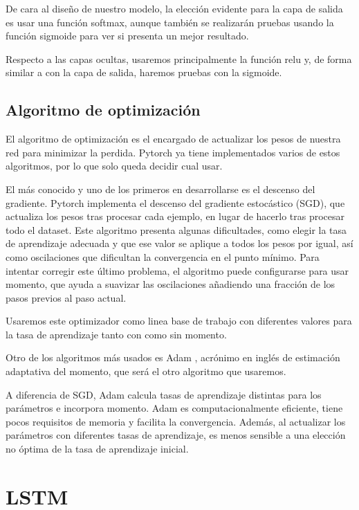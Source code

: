 De cara al diseño de nuestro modelo, la elección evidente para la capa
de salida es usar una función softmax, aunque también se realizarán
pruebas usando la función sigmoide para ver si presenta un mejor
resultado.

Respecto a las capas ocultas, usaremos principalmente la función relu y,
de forma similar a con la capa de salida, haremos pruebas con la
sigmoide.

\subsection{Algoritmo de optimización}\label{algoritmo-de-optimizacion}

El algoritmo de optimización es el encargado de actualizar los pesos de
nuestra red para minimizar la perdida. Pytorch ya tiene implementados
varios de estos algoritmos, por lo que solo queda decidir cual usar.

El más conocido y uno de los primeros en desarrollarse es el descenso
del gradiente. Pytorch implementa el descenso del gradiente estocástico
(SGD), que actualiza los pesos tras procesar cada ejemplo, en lugar de
hacerlo tras procesar todo el dataset. Este algoritmo presenta algunas
dificultades, como elegir la tasa de aprendizaje adecuada y que ese
valor se aplique a todos los pesos por igual, así como oscilaciones que
dificultan la convergencia en el punto mínimo. Para intentar corregir
este último problema, el algoritmo puede configurarse para usar momento,
que ayuda a suavizar las oscilaciones añadiendo una fracción de los
pasos previos al paso actual.

Usaremos este optimizador como linea base de trabajo con diferentes
valores para la tasa de aprendizaje tanto con como sin momento.

Otro de los algoritmos más usados es Adam \cite{2014arXiv1412.6980K}, acrónimo en inglés de
estimación adaptativa del momento, que será el otro algoritmo que
usaremos.

A diferencia de SGD, Adam calcula tasas de aprendizaje distintas para
los parámetros e incorpora momento. Adam es computacionalmente
eficiente, tiene pocos requisitos de memoria y facilita la convergencia.
Además, al actualizar los parámetros con diferentes tasas de
aprendizaje, es menos sensible a una elección no óptima de la tasa de
aprendizaje inicial.

\section{LSTM}\label{sec:lstm}

